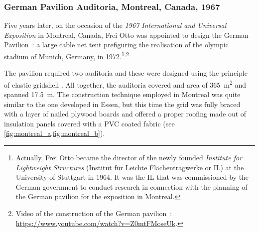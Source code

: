 


\subsubsection{German Pavilion Auditoria, Montreal, Canada, 1967}
Five years later, on the occasion of the \emph{1967 International and Universal Exposition} in Montreal, Canada, Frei Otto was appointed to design the German Pavilion~: a large cable net tent prefiguring the realisation of the olympic stadium of Munich, Germany, in 1972.\footnote{Actually, Frei Otto became the director of the newly founded \emph{Institute for Lightweight Structures} (Institut für Leichte Flächentragwerke or IL) at the University of Stuttgart in 1964. It was the IL that was commissioned by the German government to conduct research in connection with the planning of the German pavilion for the exposition in Montreal.}\textsuperscript{,}\footnote{Video of the construction of the German pavilion~: \url{https://www.youtube.com/watch?v=Z0mtFMoseUk}.}

The pavilion required two auditoria and these were designed using the principle of elastic gridshell \cite[p.~274]{IL10}. All together, the auditoria covered and area of \SI{365}{m^2} and spanned \SI{17.5}{m}. The construction technique employed in Montreal was quite similar to the one developed in Essen, but this time the grid was fully braced with a layer of nailed plywood boards and offered a proper roofing made out of insulation panels covered with a PVC coated fabric (see \cref{fig:montreal_a,fig:montreal_b}).

